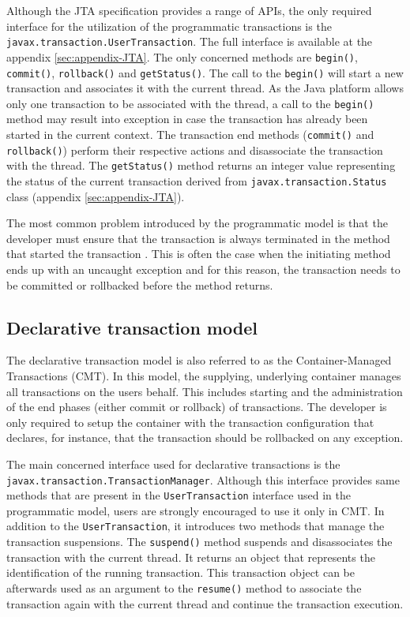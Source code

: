 \documentclass[oneside,
  digital, %
  table,   %
  nolof,     %
  nolot,     %
]{fithesis3}
\begin{document}
Although the JTA specification provides a range of APIs, the only required interface for the utilization of the programmatic transactions is the \texttt{javax.transaction.UserTransaction}. The full interface is available at the appendix \ref{sec:appendix-JTA}. The only concerned methods are \texttt{begin()}, \texttt{commit()}, \texttt{rollback()} and \texttt{getStatus()}. The call to the \texttt{begin()} will start a new transaction and associates it with the current thread. As the Java platform allows only one transaction to be associated with the thread, a call to the \texttt{begin()} method may result into exception in case the transaction has already been started in the current context. The transaction end methods (\texttt{commit()} and \texttt{rollback()}) perform their respective actions and disassociate the transaction with the thread. The \texttt{getStatus()} method returns an integer value representing the status of the current transaction derived from  \texttt{javax.transaction.Status} class (appendix \ref{sec:appendix-JTA}).

The most common problem introduced by the programmatic model is that the developer must ensure that the transaction is always terminated in the method that started the transaction \cite{java_transaction_design_strategies}. This is often the case when  the initiating method ends up with an uncaught exception and for this reason, the transaction needs to be committed or rollbacked before the method returns.

\subsection{Declarative transaction model}

The declarative transaction model is also referred to as the Container-Managed Transactions (CMT). In this model, the supplying, underlying container manages all transactions on the users behalf. This includes starting and the administration of the end phases (either commit or rollback) of transactions. The developer is only required to setup the container with the transaction configuration that declares, for instance, that the transaction should be rollbacked on any exception.

The main concerned interface used for declarative transactions is the \texttt{javax.transaction.TransactionManager}. Although this interface provides  same methods that are present in the \texttt{UserTransaction} interface used in the programmatic model, users are strongly encouraged to use it only in CMT. In addition to the \texttt{UserTransaction}, it introduces two methods that manage the transaction suspensions. The \texttt{suspend()} method suspends and  disassociates the transaction with the current thread. It returns an object that represents the identification of the running transaction. This transaction object can be afterwards used as an argument to the \texttt{resume()} method to associate the transaction again with the current thread and continue the transaction execution.
\end{document}
